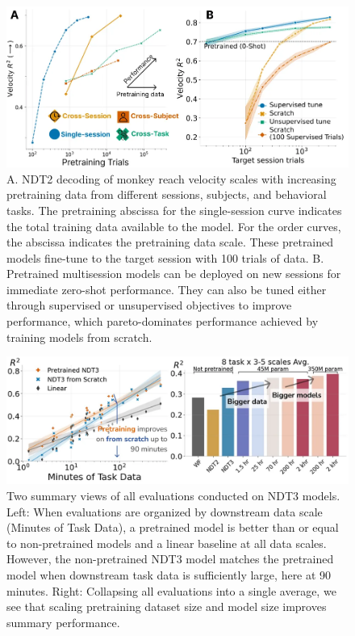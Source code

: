 \documentclass[12pt,oneside]{report}
\begin{document}
\begin{figure}[h]
  \centering
  \includegraphics[width=0.5\linewidth]{ch2_ndt2_results.png}
  \caption{A. NDT2 decoding of monkey reach velocity scales with increasing pretraining data from different sessions, subjects, and behavioral tasks. The pretraining abscissa for the single-session curve indicates the total training data available to the model. For the order curves, the abscissa indicates the pretraining data scale. These pretrained models fine-tune to the target session with 100 trials of data. B. Pretrained multisession models can be deployed on new sessions for immediate zero-shot performance. They can also be tuned either through supervised or unsupervised objectives to improve performance, which pareto-dominates performance achieved by training models from scratch.}
  \label{fig:ndt2_results}
\end{figure}

\begin{figure}[h]
  \centering
  \includegraphics[width=0.5\linewidth]{ch2_ndt3_summary.png}
  \caption{Two summary views of all evaluations conducted on NDT3 models. Left: When evaluations are organized by downstream data scale (Minutes of Task Data), a pretrained model is better than or equal to non-pretrained models and a linear baseline at all data scales. However, the non-pretrained NDT3 model matches the pretrained model when downstream task data is sufficiently large, here at 90 minutes. Right: Collapsing all evaluations into a single average, we see that scaling pretraining dataset size and model size improves summary performance.}
  \label{fig:ndt3_summary}
\end{figure}
\end{document}
